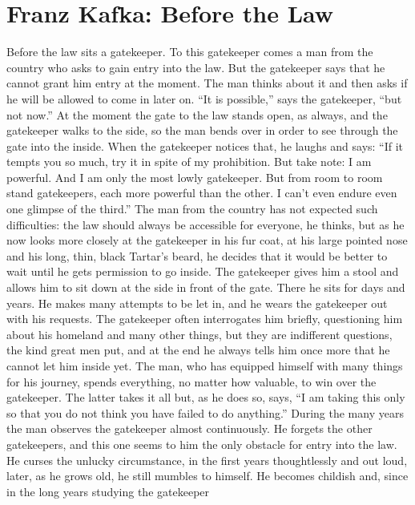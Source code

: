\documentclass[12pt]{book}
\begin{document}
\chapter*{Franz Kafka: Before the Law}

Before the law sits a gatekeeper. To this
gatekeeper comes a man from the country who asks to gain entry into the law.
But the gatekeeper says that he cannot grant him entry at the moment.
The man thinks about it and then asks if he will be allowed to come in
later on. ``It is possible,'' says the gatekeeper, ``but not now.''
At the moment the gate to the law stands open, as always, and the
gatekeeper walks to the side, so the man bends over in order to see through the
gate into the inside. When the
gatekeeper notices that, he laughs and says: ``If it tempts you so much, try it
in spite of my prohibition. But
take note: I am powerful. And I am only the most lowly gatekeeper.
But from room to room stand gatekeepers, each more powerful than the
other. I can't even endure even one glimpse of the third.''
The man from the country has not expected such difficulties: the law
should always be accessible for everyone, he thinks, but as he now looks more
closely at the gatekeeper in his fur coat, at his large pointed nose and his
long, thin, black Tartar's beard, he decides that it would be better to wait
until he gets permission to go inside. The
gatekeeper gives him a stool and allows him to sit down at the side in front of
the gate. There he sits for days and years. He makes many attempts to be let in, and he wears the
gatekeeper out with his requests. The
gatekeeper often interrogates him briefly, questioning him about his homeland
and many other things, but they are indifferent questions, the kind great men
put, and at the end he always tells him once more that he cannot let him inside
yet. The man, who has equipped
himself with many things for his journey, spends everything, no matter how
valuable, to win over the gatekeeper. The
latter takes it all but, as he does so, says, ``I am taking this only so that
you do not think you have failed to do anything.''
During the many years the man observes the gatekeeper almost
continuously. He forgets the other
gatekeepers, and this one seems to him the only obstacle for entry into the law.
He curses the unlucky circumstance, in the first years thoughtlessly and
out loud, later, as he grows old, he still mumbles to himself.
He becomes childish and, since in the long years studying the gatekeeper
\end{document}
